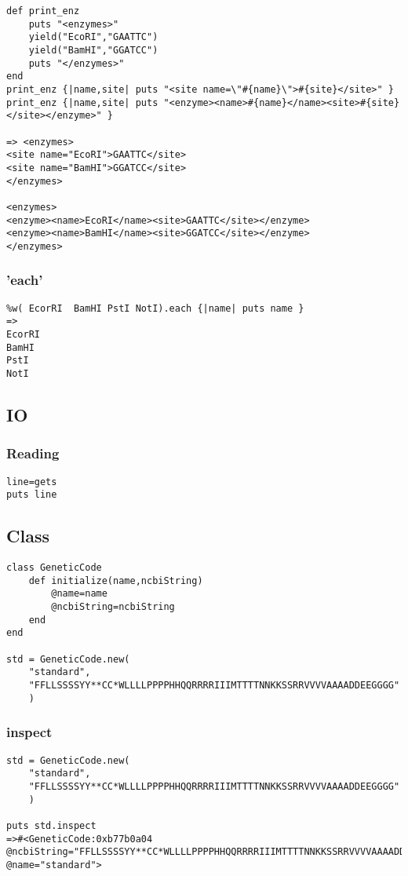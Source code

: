 \documentclass{article}
\begin{document}
\begin{lstlisting}
def print_enz
	puts "<enzymes>"
	yield("EcoRI","GAATTC")
	yield("BamHI","GGATCC")
	puts "</enzymes>"
end
print_enz {|name,site| puts "<site name=\"#{name}\">#{site}</site>" }
print_enz {|name,site| puts "<enzyme><name>#{name}</name><site>#{site}</site></enzyme>" }

=> <enzymes>
<site name="EcoRI">GAATTC</site>
<site name="BamHI">GGATCC</site>
</enzymes>

<enzymes>
<enzyme><name>EcoRI</name><site>GAATTC</site></enzyme>
<enzyme><name>BamHI</name><site>GGATCC</site></enzyme>
</enzymes>
\end{lstlisting}

\subsubsection{ 'each'}
\begin{lstlisting}
%w( EcorRI  BamHI PstI NotI).each {|name| puts name }
=>
EcorRI
BamHI
PstI
NotI
\end{lstlisting}

\subsection{IO}
\subsubsection{Reading}
\begin{lstlisting}
line=gets
puts line
\end{lstlisting}

\subsection{Class}
\begin{lstlisting}
class GeneticCode
	def initialize(name,ncbiString)
		@name=name
		@ncbiString=ncbiString
	end
end

std = GeneticCode.new(
	"standard",
	"FFLLSSSSYY**CC*WLLLLPPPPHHQQRRRRIIIMTTTTNNKKSSRRVVVVAAAADDEEGGGG"
	)
\end{lstlisting}
\subsubsection{inspect}
\begin{lstlisting}
std = GeneticCode.new(
	"standard",
	"FFLLSSSSYY**CC*WLLLLPPPPHHQQRRRRIIIMTTTTNNKKSSRRVVVVAAAADDEEGGGG"
	)

puts std.inspect
=>#<GeneticCode:0xb77b0a04 @ncbiString="FFLLSSSSYY**CC*WLLLLPPPPHHQQRRRRIIIMTTTTNNKKSSRRVVVVAAAADDEEGGGG", @name="standard">
\end{lstlisting}
\end{document}
